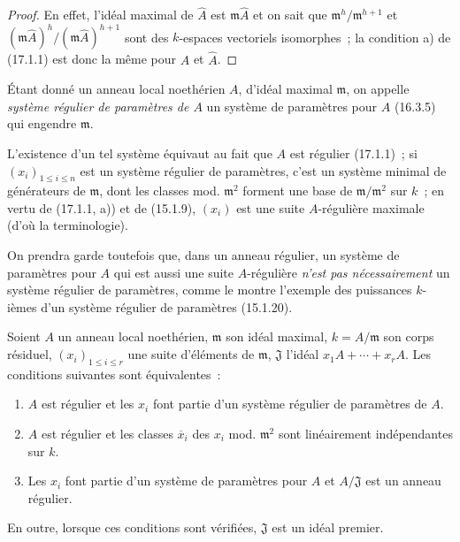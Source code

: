 \begin{proof}
En effet, l'idéal maximal de $\widehat{A}$ est $\mathfrak{m}\widehat{A}$ et on
sait que $\mathfrak{m}^h/\mathfrak{m}^{h+1}$ et
$(\mathfrak{m}\widehat{A})^h/(\mathfrak{m}\widehat{A})^{h+1}$ sont des
$k$-espaces vectoriels isomorphes~; la condition a) de (17.1.1) est donc la
même pour $A$ et $\widehat{A}$.
\end{proof}

\begin{definition}[17.1.6]
\label{0.17.1.6-fr}
Étant donné un anneau local noethérien $A$, d'idéal maximal $\mathfrak{m}$, on
appelle \emph{système régulier de paramètres de $A$} un système de paramètres
pour $A$ (16.3.5) qui engendre $\mathfrak{m}$.
\end{definition}

L'existence d'un tel système équivaut au fait que $A$ est régulier (17.1.1)~;
si $(x_i)_{1\leq i\leq n}$ est un système régulier de paramètres, c'est un
système minimal de générateurs de $\mathfrak{m}$, dont les classes mod.
$\mathfrak{m}^2$ forment une base de $\mathfrak{m}/\mathfrak{m}^2$ sur $k$~;
en vertu de (17.1.1, a)) et de (15.1.9), $(x_i)$ est une suite $A$-régulière
maximale (d'où la terminologie).

On prendra garde toutefois que, dans un anneau régulier, un système de
paramètres pour $A$ qui est aussi une suite $A$-régulière \emph{n'est pas
nécessairement} un système régulier de paramètres, comme le montre l'exemple
des puissances $k$-ièmes d'un système régulier de paramètres (15.1.20).

\begin{proposition}[17.1.7]
\label{0.17.1.7-fr}
Soient $A$ un anneau local noethérien, $\mathfrak{m}$ son idéal maximal,
$k=A/\mathfrak{m}$ son corps résiduel, $(x_i)_{1\leq i\leq r}$ une suite
d'éléments de $\mathfrak{m}$, $\mathfrak{J}$ l'idéal
$x_1A+\cdots+x_rA$. Les conditions suivantes sont équivalentes~:
\begin{enumerate}
  \item[\rm a)] $A$ est régulier et les $x_i$ font partie d'un système
  régulier de paramètres de $A$.
  \item[\rm a')] $A$ est régulier et les classes $\overline{x}_i$ des $x_i$
  mod. $\mathfrak{m}^2$ sont linéairement indépendantes sur $k$.
  \item[\rm b)] Les $x_i$ font partie d'un système de paramètres pour $A$ et
  $A/\mathfrak{J}$ est un anneau régulier.
\end{enumerate}
En outre, lorsque ces conditions sont vérifiées, $\mathfrak{J}$ est un idéal
premier.
\end{proposition}


